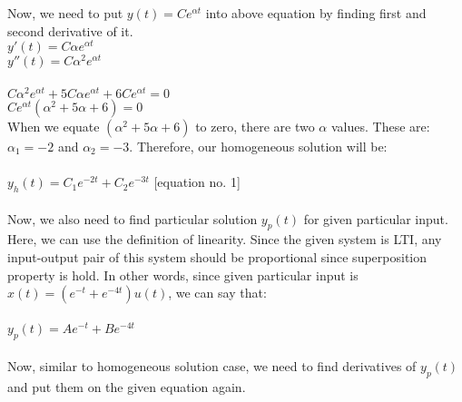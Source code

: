 \documentclass[10pt,a4paper, margin=1in]{article}
\begin{document}
\begin{enumerate}
\begin{enumerate}
    Now, we need to put $y(t) = C e^{\alpha t}$ into above equation by finding first and second derivative of it. \\
    $y'(t) = C \alpha e^{\alpha t}$ \\
    $y''(t) = C \alpha^2 e^{\alpha t}$ \\
    \\
    $C \alpha^2 e^{\alpha t} + 5 C \alpha e^{\alpha t} + 6 C e^{\alpha t} = 0$ \\
    $C e^{\alpha t} (\alpha^2 + 5 \alpha + 6) = 0$ \\
    When we equate $(\alpha^2 + 5 \alpha + 6)$ to zero, there are two $\alpha$ values. These are: \\
    $\alpha_1 = -2$ and $\alpha_2 = -3$. Therefore, our homogeneous solution will be: \\
    \\
    $y_h(t) = C_1 e^{-2 t} + C_2 e^{-3 t}$ [equation no. 1] \\
    \\
    Now, we also need to find particular solution $y_p(t)$ for given particular input. Here, we can use the definition of linearity. Since the given system is LTI, any input-output pair of this system should be proportional since superposition property is hold. In other words, since given particular input is $x(t) = (e^{-t} + e^{-4t})u(t)$, we can say that: \\
    \\
    $y_p(t) = A e^{-t} + B e^{-4t}$ \\
    \\
    Now, similar to homogeneous solution case, we need to find derivatives of $y_p(t)$ and put them on the given equation again. \\
    

\end{enumerate}
\end{enumerate}
\end{document}
